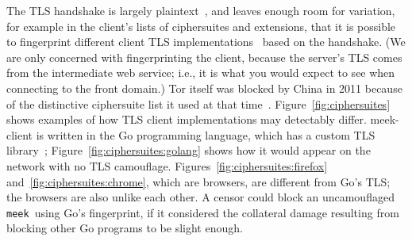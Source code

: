 \documentclass[conference]{IEEEtran}
\newcommand{\meekclient}{\mbox{meek-client}\xspace}
\newcommand{\meek}{\texttt{meek}\xspace}
\begin{document}
The TLS handshake is largely plaintext~\cite[Section~7.4]{rfc5246}, and leaves
enough room for variation, for example in
the client's lists of ciphersuites and extensions,
that it is possible to fingerprint different client TLS implementations~\cite{ssl-p0f}
based on the handshake.
(We are only concerned with fingerprinting the client,
because the server's TLS
comes from the intermediate web service;
i.e., it is what you would expect to see when connecting to the front domain.)
Tor itself was blocked by China in 2011
because of the distinctive ciphersuite list it used at that time~\cite{bug4744}.
Figure~\ref{fig:ciphersuites} shows examples of how TLS client
implementations may detectably differ.
\meekclient is written in the Go programming language,
which has a custom TLS library~\cite{golang-crypto/tls};
Figure~\ref{fig:ciphersuites:golang}
shows how it would appear on the network with no TLS camouflage.
Figures~\ref{fig:ciphersuites:firefox} and~\ref{fig:ciphersuites:chrome},
which are browsers, are different from Go's TLS; the browsers are also unlike each other.
A censor could block an uncamouflaged \meek\ using Go's fingerprint,
if it considered the collateral damage resulting from blocking other Go programs to be slight enough.
\end{document}
